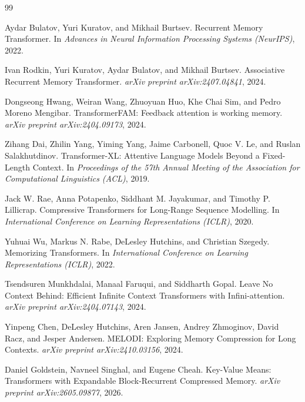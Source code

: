 \documentclass[10pt]{article} %
\begin{document}
\begin{thebibliography}{99}

Aydar Bulatov, Yuri Kuratov, and Mikhail Burtsev.
\newblock Recurrent Memory Transformer.
\newblock In \emph{Advances in Neural Information Processing Systems (NeurIPS)}, 2022.

Ivan Rodkin, Yuri Kuratov, Aydar Bulatov, and Mikhail Burtsev.
\newblock Associative Recurrent Memory Transformer.
\newblock \emph{arXiv preprint arXiv:2407.04841}, 2024.

Dongseong Hwang, Weiran Wang, Zhuoyuan Huo, Khe Chai Sim, and Pedro Moreno Mengibar.
\newblock TransformerFAM: Feedback attention is working memory.
\newblock \emph{arXiv preprint arXiv:2404.09173}, 2024.

Zihang Dai, Zhilin Yang, Yiming Yang, Jaime Carbonell, Quoc V. Le, and Ruslan Salakhutdinov.
\newblock Transformer-XL: Attentive Language Models Beyond a Fixed-Length Context.
\newblock In \emph{Proceedings of the 57th Annual Meeting of the Association for Computational Linguistics (ACL)}, 2019.

Jack W. Rae, Anna Potapenko, Siddhant M. Jayakumar, and Timothy P. Lillicrap.
\newblock Compressive Transformers for Long-Range Sequence Modelling.
\newblock In \emph{International Conference on Learning Representations (ICLR)}, 2020.

Yuhuai Wu, Markus N. Rabe, DeLesley Hutchins, and Christian Szegedy.
\newblock Memorizing Transformers.
\newblock In \emph{International Conference on Learning Representations (ICLR)}, 2022.

Tsendsuren Munkhdalai, Manaal Faruqui, and Siddharth Gopal.
\newblock Leave No Context Behind: Efficient Infinite Context Transformers with Infini-attention.
\newblock \emph{arXiv preprint arXiv:2404.07143}, 2024.

Yinpeng Chen, DeLesley Hutchins, Aren Jansen, Andrey Zhmoginov, David Racz, and Jesper Andersen.
\newblock MELODI: Exploring Memory Compression for Long Contexts.
\newblock \emph{arXiv preprint arXiv:2410.03156}, 2024.

Daniel Goldstein, Navneel Singhal, and Eugene Cheah.
\newblock Key-Value Means: Transformers with Expandable Block-Recurrent Compressed Memory.
\newblock \emph{arXiv preprint arXiv:2605.09877}, 2026.


\end{thebibliography}
\end{document}
